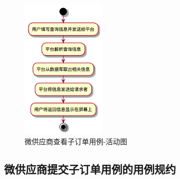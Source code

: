 \begin{figure}[htp]
    \centering
    \includegraphics[width=4cm]{image/chap01/uc_suborder_query.png}
    \caption{微供应商查看子订单用例-活动图}
    \label{fig:uc_suborder_query}
\end{figure}


\subsection{微供应商提交子订单用例的用例规约}

